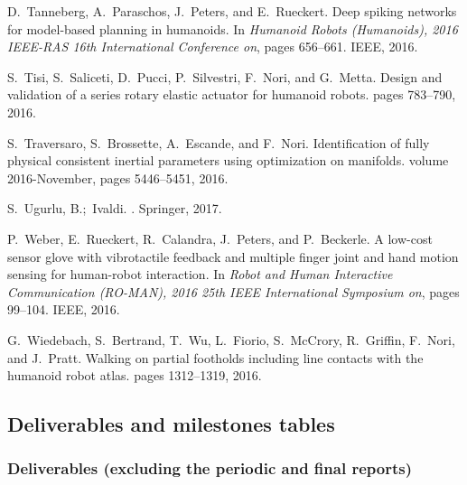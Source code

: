 \documentclass[12pt,a4paper,twoside]{article}
\begin{document}
\begin{thebibliography}{}
D.~Tanneberg, A.~Paraschos, J.~Peters, and E.~Rueckert.
\newblock Deep spiking networks for model-based planning in humanoids.
\newblock In {\em Humanoid Robots (Humanoids), 2016 IEEE-RAS 16th International
  Conference on}, pages 656--661. IEEE, 2016.

S.~Tisi, S.~Saliceti, D.~Pucci, P.~Silvestri, F.~Nori, and G.~Metta.
\newblock Design and validation of a series rotary elastic actuator for
  humanoid robots.
\newblock pages 783--790, 2016.

S.~Traversaro, S.~Brossette, A.~Escande, and F.~Nori.
\newblock Identification of fully physical consistent inertial parameters using
  optimization on manifolds.
\newblock volume 2016-November, pages 5446--5451, 2016.

S.~Ugurlu, B.;~Ivaldi.
.
\newblock Springer, 2017.

P.~Weber, E.~Rueckert, R.~Calandra, J.~Peters, and P.~Beckerle.
\newblock A low-cost sensor glove with vibrotactile feedback and multiple
  finger joint and hand motion sensing for human-robot interaction.
\newblock In {\em Robot and Human Interactive Communication (RO-MAN), 2016 25th
  IEEE International Symposium on}, pages 99--104. IEEE, 2016.

G.~Wiedebach, S.~Bertrand, T.~Wu, L.~Fiorio, S.~McCrory, R.~Griffin, F.~Nori,
  and J.~Pratt.
\newblock Walking on partial footholds including line contacts with the
  humanoid robot atlas.
\newblock pages 1312--1319, 2016.
\end{thebibliography}

\subsection{Deliverables and milestones tables}

\subsubsection{Deliverables (excluding the periodic and final reports)}
\end{document}

